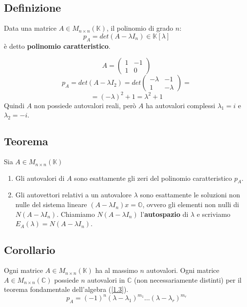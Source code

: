 \documentclass[a4paper]{article}
\theoremstyle{break}
\theoremstyle{break}
\theoremstyle{break}
\theoremstyle{break}
\begin{document}
\subsection{Definizione}
Data una matrice \( A \in  M_{n \times n}(\mathbb{K}) \), il polinomio di grado \( n \):
\[
  p_A = det(A - \lambda I_n) \in \mathbb{K}[\lambda]
\] 
è detto \textbf{polinomio caratteristico}.

\begin{example}
  \[
  A = \begin{pmatrix} 
    1 & -1\\
    1 & 0
  \end{pmatrix} 
  \] 
  \vspace{1em}
  \[
  p_A = det(A - \lambda I_2) = det \begin{pmatrix} 
    - \lambda & -1\\
    1 & - \lambda
  \end{pmatrix} 
  =
  \] 
  \[
  = (-\lambda)^2 + 1 = \lambda^2 + 1
  \] 
  Quindi \( A \) non possiede autovalori reali, però \( A \) ha autovalori complessi
  \( \lambda_1 = i \) e \( \lambda_2 = -i \).
\end{example}

\subsection{Teorema}
Sia \( A \in M_{n \times n}(\mathbb{K}) \)
\begin{enumerate}
  \item Gli autovalori di \( A \) sono esattamente gli zeri del polinomio caratteristico
    \( p_A \).

  \item Gli autovettori relativi a un autovalore \( \lambda \) sono esattamente le 
    soluzioni non nulle del sistema lineare \( (A - \lambda I_n)x = \mathbb{O} \),
    ovvero gli elementi non nulli di \( N(A - \lambda I_n) \).
    Chiamiamo \( N(A - \lambda I_n) \) l'\textbf{autospazio} di \( \lambda \) e scriviamo
    \( E_A(\lambda) = N(A - \lambda I_n) \).
\end{enumerate}

\subsection{Corollario}
Ogni matrice \( A \in  M_{n \times n}(\mathbb{K}) \) ha al massimo \( n \) autovalori.
Ogni matrice \( A \in M_{n \times n}(\mathbb{C}) \) possiede \( n \) autovalori in
\( \mathbb{C} \) (non necessariamente distinti) per il teorema fondamentale dell'algebra
(\ref{1.3}).
\[
  p_A = (-1)^n(\lambda - \lambda_1)^{m_1} \ldots (\lambda - \lambda_r)^{m_r}
\] 
\end{document}
